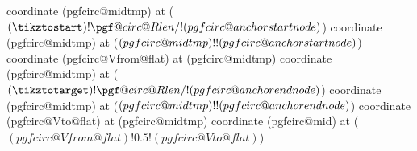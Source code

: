 {{        \fi
    }
    coordinate (pgfcirc@midtmp) at ($(\tikztostart) ! \pgf@circ@Rlen/\ctikzvalof{current arrow scale} ! (pgfcirc@anchorstartnode)$)
    coordinate (pgfcirc@midtmp) at ($(pgfcirc@midtmp) ! \distancefromnode ! (pgfcirc@anchorstartnode)$)
    coordinate (pgfcirc@Vfrom@flat) at (pgfcirc@midtmp)
    coordinate (pgfcirc@midtmp) at ($(\tikztotarget) ! \pgf@circ@Rlen/\ctikzvalof{current arrow scale} ! (pgfcirc@anchorendnode)$)
    coordinate (pgfcirc@midtmp) at ($(pgfcirc@midtmp) ! \distancefromnode ! (pgfcirc@anchorendnode)$)
    coordinate (pgfcirc@Vto@flat) at (pgfcirc@midtmp)
    coordinate (pgfcirc@mid) at ($(pgfcirc@Vfrom@flat)!0.5!(pgfcirc@Vto@flat)$)

}
